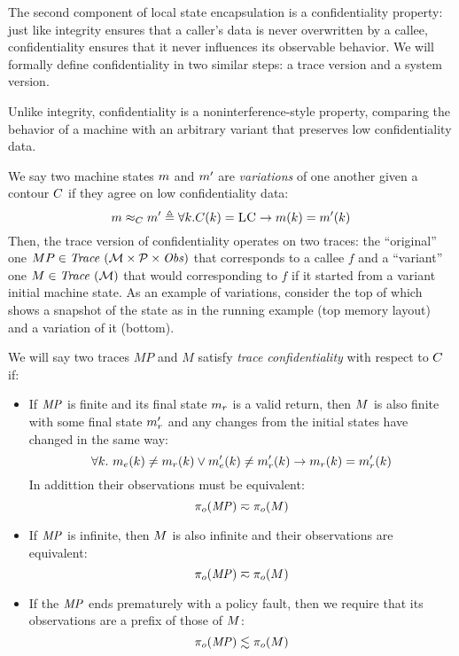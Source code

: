 \documentclass[acmsmall,review,anonymous]{acmart}\settopmatter{printfolios=true,printccs=false,printacmref=false}
\begin{document}
The second component of local state encapsulation is a confidentiality
property: just like integrity ensures that a caller's data is never
overwritten by a callee, confidentiality ensures that it never
influences its observable behavior. We will formally define
confidentiality in two similar steps: a trace version and a system
version.

Unlike integrity, confidentiality is a noninterference-style property,
comparing the behavior of a machine with an arbitrary variant that
preserves low confidentiality data.

We say two machine states $m$ and $m'$ are {\em variations} of one
another given a contour $C$ if they agree on low
confidentiality data:
%
\[
m \approx_C m' \triangleq \forall k .
C(k) = \textsc{LC} \rightarrow m(k) =
m'(k)
\]
%
Then, the trace version of confidentiality operates on two traces: the
``original'' one $MP \in \mathit{Trace}~({\mathcal M} \times \mathcal{P} \times \mathit{Obs})$ that corresponds to a callee $f$
and a ``variant'' one $M \in \mathit{Trace}~({\mathcal M})$ that would corresponding to $f$
if it started from a variant initial machine state.
%
As an example of variations, consider the top of 
which shows a snapshot of the state as in the running example (top
memory layout) and a variation of it (bottom). 

 We will say two traces $MP$ and $M$
satisfy {\em trace confidentiality} with respect to $C$ if:
\begin{itemize}
\item If $\mathit{MP}$ is finite and its final state $m_r$ is a valid
  return, then $M$ is also finite with some final state $m_r'$ and
  any changes from the initial states have changed in the same way:
$$\forall k. ~ m_e(k) \not = m_r(k)
  \vee m_e'(k) \not = m_r'(k) \rightarrow
  m_r(k) = m_r'(k)$$
  In addittion their observations must be equivalent:
  $$\pi_o(\mathit{MP}) \eqsim \pi_o(M)$$
\item If $\mathit{MP}$ is infinite, then $M$ is also infinite and their
  observations are equivalent:
  $$\pi_o(\mathit{MP}) \eqsim \pi_o(M)$$
\item If the $\mathit{MP}$ ends prematurely with a policy fault, then
  we require that its observations are a prefix of those of $M$:
  $$\pi_o(\mathit{MP}) \lesssim \pi_o(M)$$
\end{itemize}
\end{document}
